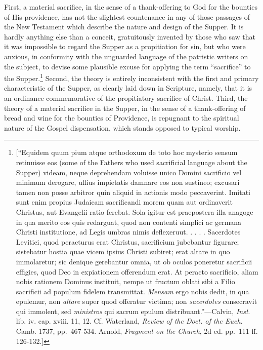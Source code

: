 \documentclass[english,]{book}
\begin{document}
First, a material sacrifice, in the sense of a thank-offering to God for the bounties of His providence, has not the slightest countenance in any of those passages of the New Testament which describe the nature and design of the Supper. It is hardly anything else than a conceit, gratuitously invented by those who saw that it was impossible to regard the Supper as a propitiation for sin, but who were anxious, in conformity with the unguarded language of the patristic writers on the subject, to devise some plausible excuse for applying the term ``sacrifice'' to the Supper.\footnote{{[}``Equidem quum pium atque orthodoxum de toto hoc mysterio sensum retinuisse eos (some of the Fathers who used sacrificial language about the Supper) videam, neque deprehendam voluisse unico Domini sacrificio vel minimum derogare, ullius impietatis damnare eos non sustineo; excusari tamen non posse arbitror quin aliquid in actionis modo peccaverint. Imitati sunt enim propius Judaicam sacrificandi morem quam aut ordinaverit Christus, aut Evangelii ratio ferebat. Sola igitur est praepostera illa anagoge in qua merito eos quis redarguat, quod non contenti simplici ac germana Christi institutione, ad Legis umbras nimis deflexeruut. . . . . Sacerdotes Levitici, quod peracturus erat Christus, sacrificium jubebantur figurare; sistebatur hostia quae vicem ipsius Christi subiret; erat altare in quo immolaretur; sic denique gerebantur omnia, ut ob oculos poneretur sacrificii effigies, quod Deo in expiationem offerendum erat. At peracto sacrificio, aliam nobis rationem Dominus instituit, nempe ut fructum oblati sibi a Filio sacrificii ad populum fidelem transmittat. \emph{Mensam} ergo nobis dedit, in qua epulemur, non \emph{altare} super quod offeratur victima; non \emph{sacerdotes} consecravit qui immolent, sed \emph{ministros} qui sacrum epulum distribuant.''---Calvin, \emph{Inst}. lib. iv. cap. xviii. 11, 12. Cf. Waterland, \emph{Review of the Doct. of the Euch}. Camb. 1737, pp.~467-534. Arnold, \emph{Fragment on the Church}, 2d ed. pp.~111 ff. 126-132.{]}} Second, the theory is entirely inconsistent with the first and primary characteristic of the Supper, as clearly laid down in Scripture, namely, that it is an ordinance commemorative of the propitiatory sacrifice of Christ. Third, the theory of a material sacrifice in the Supper, in the sense of a thank-offering of bread and wine for the bounties of Providence, is repugnant to the spiritual nature of the Gospel dispensation, which stands opposed to typical worship.
\end{document}
